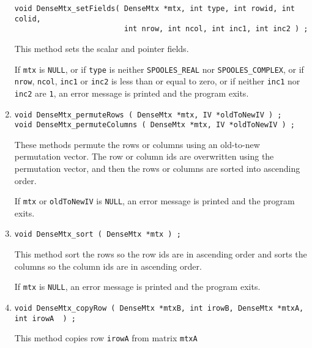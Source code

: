 \begin{enumerate}
\begin{verbatim}
void DenseMtx_setFields( DenseMtx *mtx, int type, int rowid, int colid,
                         int nrow, int ncol, int inc1, int inc2 ) ;
\end{verbatim}
This method sets the scalar and pointer fields.
\par {}
If {\tt mtx} is {\tt NULL},
or if {\tt type} is neither {\tt SPOOLES\_REAL}
nor {\tt SPOOLES\_COMPLEX},
or if {\tt nrow}, {\tt ncol}, {\tt inc1} or {\tt inc2}
is less than or equal to zero,
or if neither {\tt inc1} nor {\tt inc2} are {\tt 1},
an error message is printed and the program exits.
\item
\begin{verbatim}
void DenseMtx_permuteRows ( DenseMtx *mtx, IV *oldToNewIV ) ;
void DenseMtx_permuteColumns ( DenseMtx *mtx, IV *oldToNewIV ) ;
\end{verbatim}
These methods permute the rows or columns using an old-to-new
permutation vector.
The row or column ids are overwritten using the permutation vector,
and then the rows or columns are sorted into ascending order.
\par {}
If {\tt mtx} or {\tt oldToNewIV} is {\tt NULL},
an error message is printed and the program exits.
\item
\begin{verbatim}
void DenseMtx_sort ( DenseMtx *mtx ) ;
\end{verbatim}
This method sort the rows so the row ids are in ascending order
and sorts the columns so the column ids are in ascending order.
\par {}
If {\tt mtx} is {\tt NULL},
an error message is printed and the program exits.
\item
\begin{verbatim}
void DenseMtx_copyRow ( DenseMtx *mtxB, int irowB, DenseMtx *mtxA, int irowA  ) ;
\end{verbatim}
This method copies row {\tt irowA} from matrix {\tt mtxA}

\end{enumerate}
